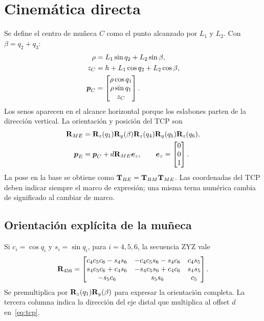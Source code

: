 \section{Cinemática directa}
Se define el centro de muñeca $C$ como el punto alcanzado por $L_1$ y $L_2$. Con $\beta=q_2+q_3$:
\begin{align}
\rho&=L_1\sin q_2+L_2\sin\beta,\\
z_C&=h+L_1\cos q_2+L_2\cos\beta,\\
\boldsymbol{p}_C&=\begin{bmatrix}\rho\cos q_1\\\rho\sin q_1\\z_C\end{bmatrix}.
\end{align}
Los senos aparecen en el alcance horizontal porque los eslabones parten de la dirección vertical. La orientación y posición del TCP son
\begin{align}
\mathbf{R}_{ME}&=\mathbf{R}_z(q_1)\mathbf{R}_y(\beta)
\mathbf{R}_z(q_4)\mathbf{R}_y(q_5)\mathbf{R}_z(q_6),\\
\boldsymbol{p}_E&=\boldsymbol{p}_C+d\mathbf{R}_{ME}\boldsymbol{e}_z,
\qquad\boldsymbol{e}_z=\begin{bmatrix}0\\0\\1\end{bmatrix}.
\label{eq:tcp}
\end{align}
La pose en la base se obtiene como $\mathbf{T}_{BE}=\mathbf{T}_{BM}\mathbf{T}_{ME}$. Las coordenadas del TCP deben indicar siempre el marco de expresión; una misma terna numérica cambia de significado al cambiar de marco.

\subsection{Orientación explícita de la muñeca}
Si $c_i=\cos q_i$ y $s_i=\sin q_i$, para $i=4,5,6$, la secuencia ZYZ vale
\begin{equation}
\mathbf{R}_{456}=\begin{bmatrix}
c_4c_5c_6-s_4s_6&-c_4c_5s_6-s_4c_6&c_4s_5\\
s_4c_5c_6+c_4s_6&-s_4c_5s_6+c_4c_6&s_4s_5\\
-s_5c_6&s_5s_6&c_5
\end{bmatrix}.
\end{equation}
Se premultiplica por $\mathbf{R}_z(q_1)\mathbf{R}_y(\beta)$ para expresar la orientación completa. La tercera columna indica la dirección del eje distal que multiplica al offset $d$ en~\eqref{eq:tcp}.

